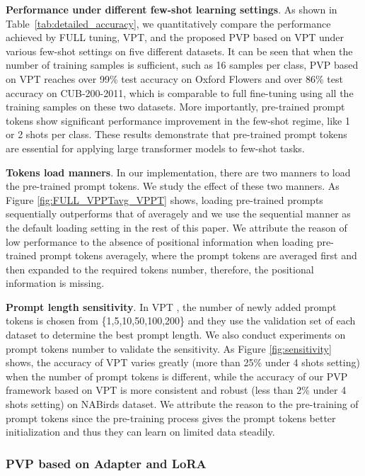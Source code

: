 \documentclass[10pt,journal,letterpaper,compsoc]{IEEEtran}
\begin{document}
\textbf{Performance under different few-shot learning settings}. As shown in Table~\ref{tab:detailed_accuracy}, we quantitatively compare the performance achieved by FULL tuning, VPT, and the proposed PVP based on VPT under various few-shot settings on five different datasets. It can be seen that when the number of training samples is sufficient, such as 16 samples per class, PVP based on VPT reaches over 99\% test accuracy on Oxford Flowers and over 86\% test accuracy on CUB-200-2011, which is comparable to full fine-tuning using all the training samples on these two datasets. More importantly, pre-trained prompt tokens show significant performance improvement in the few-shot regime, like 1 or 2 shots per class. These results demonstrate that pre-trained prompt tokens are essential for applying large transformer models to few-shot tasks.

\textbf{Tokens load manners}. In our implementation, there are two manners to load the pre-trained prompt tokens. We study the effect of these two manners. As Figure \ref{fig:FULL_VPPTavg_VPPT} shows, loading pre-trained prompts sequentially outperforms that of averagely and we use the sequential manner as the default loading setting in the rest of this paper. We attribute the reason of low performance to the absence of positional information when loading pre-trained prompt tokens averagely, where the prompt tokens are averaged first and then expanded to the required tokens number, therefore, the positional information is missing.

\textbf{Prompt length sensitivity}. In VPT \cite{vpt}, the number of newly added prompt tokens is chosen from \{1,5,10,50,100,200\} and they use the validation set of each dataset to determine the best prompt length. We also conduct experiments on prompt tokens number to validate the sensitivity. As Figure \ref{fig:sensitivity} shows, the accuracy of VPT varies greatly (more than 25\% under 4 shots setting) when the number of prompt tokens is different, while the accuracy of our PVP framework based on VPT is more consistent and robust (less than 2\% under 4 shots setting) on NABirds dataset. We attribute the reason to the pre-training of prompt tokens since the pre-training process gives the prompt tokens better initialization and thus they can learn on limited data steadily.

\subsubsection{PVP based on Adapter and LoRA}\label{section:sec4.3.2}
\end{document}
